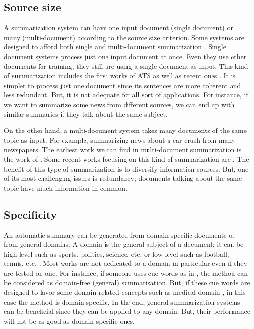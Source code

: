 \subsection{Source size}

A summarization system can have one input document (single document) or many (multi-document) according to the source size criterion.
Some systems are designed to afford both single and multi-document summarization \citep{15-henss-al,15-aries-al}.
Single document systems process just one input document at once.
Even they use other documents for training, they still are using a single document as input. 
This kind of summarization includes the first works of ATS \citep{58-luhn,58-baxendale,69-edmundson} as well as recent ones \citep{16-durrett-al,19-saini-al,19-liu-al}.
It is simpler to process just one document since its sentences are more coherent and less redundant.
But, it is not adequate for all sort of applications.
For instance, if we want to summarize some news from different sources, we can end up with similar summaries if they talk about the same subject.

On the other hand, a multi-document system takes many documents of the same topic as input.
For example, summarizing news about a car crush from many newspapers. 
The earliest work we can find in multi-document summarization is the work of \citet{95-mckeown-radev}. 
Some recent works focusing on this kind of summarization are \citep{15-zhong-al,19-tavir-al}.
The benefit of this type of summarization is to diversify information sources.
But, one of its most challenging issues is redundancy; documents talking about the same topic have much information in common.


\subsection{Specificity}

An automatic summary can be generated from domain-specific documents or from general domains.
A domain is the general subject of a document; it can be high level such as sports, politics, science, etc. or low level such as football, tennis, etc. \citep{15-vander-al}.
Most works are not dedicated to a domain in particular even if they are tested on one. 
For instance, if someone uses cue words as in \citep{69-edmundson}, the method can be considered as domain-free (general) summarization. 
But, if these cue words are designed to favor some domain-related concepts such as medical domain \citep{09-sarkar}, in this case the method is domain specific. 
In the end, general summarization systems can be beneficial since they can be applied to any domain. 
But, their performance will not be as good as domain-specific ones.


